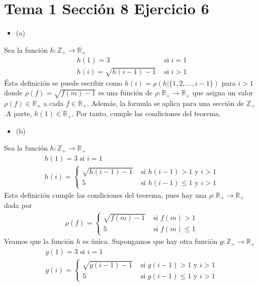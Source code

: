 \documentclass{article}
\begin{document}
\section{Tema 1 Sección 8 Ejercicio 6}
\begin{itemize}
\item (a)
\end{itemize}
Sea la función $h:\mathbb{Z}_{+}\rightarrow \mathbb{R}_{+}$
\begin{eqnarray}
h(1)=3 & \text{ si }i=1\nonumber\\
h(i)=\sqrt{h(i-1)-1} &
\text{ si }i>1 \nonumber
\end{eqnarray}
Ésta definición se puede escribir como $h(i)=\rho(h|\{1,2,...,i-1\})$ para $i>1$ donde $\rho(f)=\sqrt{f(m)-1}$ es una función de $\rho:\mathbb{R}_{+}\rightarrow \mathbb{R}_{+}$ que asigna un valor $\rho(f)\in\mathbb{R}_{+}$ a cada $f\in\mathbb{R}_{+}$. Además, la formula se aplica para una sección de $\mathbb{Z}_{+}$.A parte, $h(1)\in \mathbb{R}_{+}$. Por tanto, cumple las condiciones del teorema.
\begin{itemize}
\item (b)
\end{itemize}
Sea la función $h:\mathbb{Z}_{+}\rightarrow \mathbb{R}_{+}$
\begin{eqnarray}
&h(1)=3  \text{ si }i=1&\nonumber\\
&h(i)=\begin{cases}\sqrt{h(i-1)-1} &
\text{ si }h(i-1)> 1\text{ y } i>1 \nonumber\\
5 &
\text{ si }h(i-1)\leq 1 \text{ y } i>1 \nonumber
\end{cases}
\end{eqnarray}
Esta definición cumple las condiciones del teorema, pues hay una $\rho:\mathbb{R}_{+}\rightarrow \mathbb{R}_{+}$ dada por 
\begin{eqnarray}
\rho(f)=\begin{cases}\sqrt{f(m)-1} &
\text{ si }f(m)> 1\nonumber\\
5 &
\text{ si }f(m)\leq 1 \nonumber
\end{cases}
\end{eqnarray}
Veamos que la función $h$ es única. Supongamos que hay otra función $g:\mathbb{Z}_{+}\rightarrow \mathbb{R}_{+}$
\begin{eqnarray}
&g(1)=3  \text{ si }i=1&\nonumber\\
&g(i)=\begin{cases}\sqrt{g(i-1)-1} &
\text{ si }g(i-1)> 1\text{ y } i>1 \nonumber\\
5 &
\text{ si }g(i-1)\leq 1 \text{ y } i>1 \nonumber
\end{cases}
\end{eqnarray}
\end{document}
